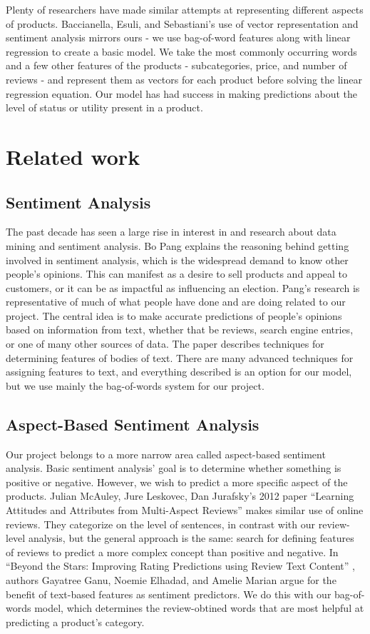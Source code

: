 \documentclass[dvips,12pt]{article}
\begin{document}
Plenty of researchers have made similar attempts at representing different aspects of products. Baccianella, Esuli, and Sebastiani’s \cite{baccianella2009multi} use of vector representation and sentiment analysis mirrors ours - we use bag-of-word features along with linear regression to create a basic model. We take the most commonly occurring words and a few other features of the products - subcategories, price, and number of reviews - and represent them as vectors for each product before solving the linear regression equation. Our model has had success in making predictions about the level of status or utility present in a product.



\section{Related work}

\subsection{Sentiment Analysis}
The past decade has seen a large rise in interest in and research about data mining and sentiment analysis. Bo Pang\cite{pang2008opinion} explains the reasoning behind getting involved in sentiment analysis, which is the widespread demand to know other people's opinions. This can manifest as a desire to sell products and appeal to customers, or it can be as impactful as influencing an election. Pang's research is representative of much of what people have done and are doing related to our project. The central idea is to make accurate predictions of people's opinions based on information from text, whether that be reviews, search engine entries, or one of many other sources of data. The paper describes techniques for determining features of bodies of text. There are many advanced techniques for assigning features to text, and everything described is an option for our model, but we use mainly the bag-of-words system for our project.

\subsection{Aspect-Based Sentiment Analysis}
Our project belongs to a more narrow area called aspect-based sentiment analysis. Basic sentiment analysis’ goal is to determine whether something is positive or negative. However, we wish to predict a more specific aspect of the products. Julian McAuley, Jure Leskovec, Dan Jurafsky’s 2012 paper “Learning Attitudes and Attributes from Multi-Aspect Reviews” \cite{mcauley2012learning} makes similar use of online reviews. They categorize on the level of sentences, in contrast with our review-level analysis, but the general approach is the same: search for defining features of reviews to predict a more complex concept than positive and negative.  In “Beyond the Stars: Improving Rating Predictions using Review Text Content” \cite{ganu2009beyond}, authors Gayatree Ganu, Noemie Elhadad, and Amelie Marian argue for the benefit of text-based features as sentiment predictors. We do this with our bag-of-words model, which determines the review-obtined words that are most helpful at predicting a product’s category.
\end{document}
